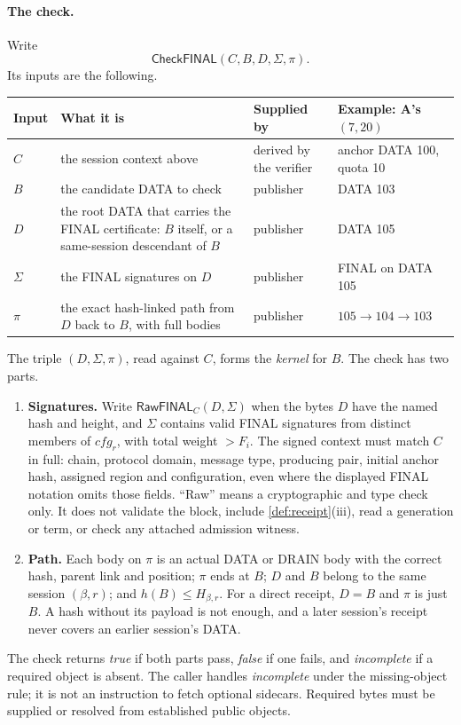 \documentclass[11pt,a4paper]{article}
\newcommand{\tagg}[1]{\ensuremath{\mathsf{#1}}}
\newcommand{\defterm}[1]{\textcolor{rrBlue}{\textit{#1}}}
\newcounter{protocol}
\begin{document}
\paragraph{The check.}
Write
\[
 \tagg{CheckFINAL}(C,B,D,\Sigma,\pi).
\]
Its inputs are the following.
\begin{center}\small
\begin{tabularx}{\linewidth}{@{}>{\raggedright\arraybackslash}p{.05\linewidth}Y>{\raggedright\arraybackslash}p{.15\linewidth}>{\raggedright\arraybackslash}p{.22\linewidth}@{}}\toprule
Input & What it is & Supplied by & Example: A's $(7,20)$\\\midrule
$C$ & the session context above & derived by the verifier & anchor DATA 100, quota 10\\
$B$ & the candidate DATA to check & publisher & DATA 103\\
$D$ & the root DATA that carries the FINAL certificate: $B$ itself, or a same-session descendant of $B$ & publisher & DATA 105\\
$\Sigma$ & the FINAL signatures on $D$ & publisher & FINAL on DATA 105\\
$\pi$ & the exact hash-linked path from $D$ back to $B$, with full bodies & publisher & $105\to104\to103$\\\bottomrule
\end{tabularx}
\end{center}
The triple $(D,\Sigma,\pi)$, read against $C$, forms the \defterm{kernel} for $B$.
The check has two parts.
\begin{enumerate}[label=(\arabic*),itemsep=2pt]
\item \textbf{Signatures.} Write $\tagg{RawFINAL}_C(D,\Sigma)$ when the
bytes $D$ have the named hash and height, and $\Sigma$ contains valid
FINAL signatures from distinct members of $\mathit{cfg}_r$, with total
weight $>F_i$. The signed context must match $C$ in full: chain,
protocol domain, message type, producing pair, initial anchor hash,
assigned region and configuration, even where the displayed FINAL
notation omits those fields. ``Raw'' means a cryptographic and type check only. It does not
validate the block, include \cref{def:receipt}(iii), read a generation
or term, or check any attached admission witness.
\item \textbf{Path.} Each body on $\pi$ is an actual DATA or DRAIN body
with the correct hash, parent link and position; $\pi$ ends at $B$; $D$
and $B$ belong to the same session $(\beta,r)$; and
$h(B)\le H_{\beta,r}$. For a direct receipt, $D=B$ and $\pi$ is just $B$.
A hash without its payload is not enough, and a later session's receipt
never covers an earlier session's DATA.
\end{enumerate}
The check returns \emph{true} if both parts pass, \emph{false} if one
fails, and \emph{incomplete} if a required object is absent. The caller
handles \emph{incomplete} under the missing-object rule; it is not an
instruction to fetch optional sidecars. Required bytes must be supplied
or resolved from established public objects.
\end{document}
